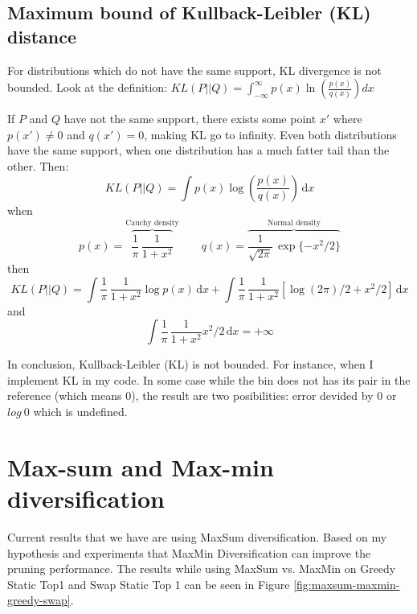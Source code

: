 \documentclass{article}
\begin{document}
\subsection{Maximum bound of Kullback-Leibler (KL) distance}

For distributions which do not have the same support, KL divergence is not bounded. Look at the definition: $KL(P\vert\vert Q) = \int_{-\infty}^{\infty} p(x)\ln\left(\frac{p(x)}{q(x)}\right) dx$

If $ P $ and $ Q $ have not the same support, there exists some point $x'$ where $p(x') \neq 0$ and $q(x') = 0$, making KL go to infinity. Even both distributions have the same support, when one distribution has a much fatter tail than the other. Then:
$$KL(P\vert\vert Q) = \int p(x)\log\left(\frac{p(x)}{q(x)}\right) \,\text{d}x$$
when
$$p(x)=\overbrace{\frac{1}{\pi}\,\frac{1}{1+x^2}}^\text{Cauchy density}\qquad q(x)=\overbrace{\frac{1}{\sqrt{2\pi}}\,\exp\{-x^2/2\}}^\text{Normal density}$$
then
$$KL(P\vert\vert Q) = \int \frac{1}{\pi}\,\frac{1}{1+x^2} \log p(x) \,\text{d}x + \int \frac{1}{\pi}\,\frac{1}{1+x^2} [\log(2\pi)/2+x^2/2]\,\text{d}x$$
and
$$\int \frac{1}{\pi}\,\frac{1}{1+x^2} x^2/2\,\text{d}x=+\infty$$

In conclusion, Kullback-Leibler (KL) is not bounded. For instance, when I implement KL in my code. In some case while the bin does not has its pair in the reference (which means 0), the result are two posibilities: error devided by 0 or $ log\ 0 $ which is undefined. 
\newline

\section{Max-sum and Max-min diversification}
Current results that we have are using MaxSum diversification. Based on my hypothesis and experiments that MaxMin Diversification can improve the pruning performance. The results while using MaxSum vs. MaxMin on Greedy Static Top1 and Swap Static Top 1 can be seen in Figure \ref{fig:maxsum-maxmin-greedy-swap}.
\end{document}
